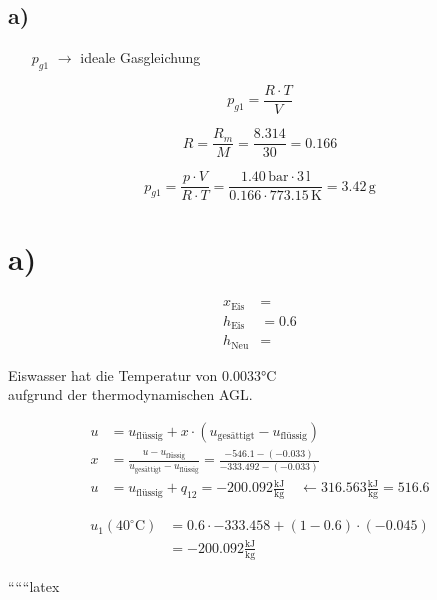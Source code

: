 

\subsection*{a)}
\begin{itemize}
    \item[$p_{g1}$] $\rightarrow$ ideale Gasgleichung
\end{itemize}

\[
p_{g1} = \frac{R \cdot T}{V}
\]

\[
R = \frac{R_m}{M} = \frac{8.314}{30} = 0.166
\]

\[
p_{g1} = \frac{p \cdot V}{R \cdot T} = \frac{1.40 \, \text{bar} \cdot 3 \, \text{l}}{0.166 \cdot 773.15 \, \text{K}} = 3.42 \, \text{g}
\]



\section*{a)}

\begin{align*}
x_{\text{Eis}} &= \\
h_{\text{Eis}} &= 0.6 \\
h_{\text{Neu}} &= 
\end{align*}

Eiswasser hat die Temperatur von 0.0033°C \\
aufgrund der thermodynamischen AGL.

\begin{align*}
u &= u_{\text{flüssig}} + x \cdot (u_{\text{gesättigt}} - u_{\text{flüssig}}) \\
x &= \frac{u - u_{\text{flüssig}}}{u_{\text{gesättigt}} - u_{\text{flüssig}}} = \frac{-546.1 - (-0.033)}{-333.492 - (-0.033)} \\
u &= u_{\text{flüssig}} + q_{12} = -200.092 \frac{\text{kJ}}{\text{kg}} \quad \leftarrow 316.563 \frac{\text{kJ}}{\text{kg}} = 516.6
\end{align*}

\begin{align*}
u_1 (40^\circ \text{C}) &= 0.6 \cdot -333.458 + (1 - 0.6) \cdot (-0.045) \\
&= -200.092 \frac{\text{kJ}}{\text{kg}}
\end{align*}

``````latex